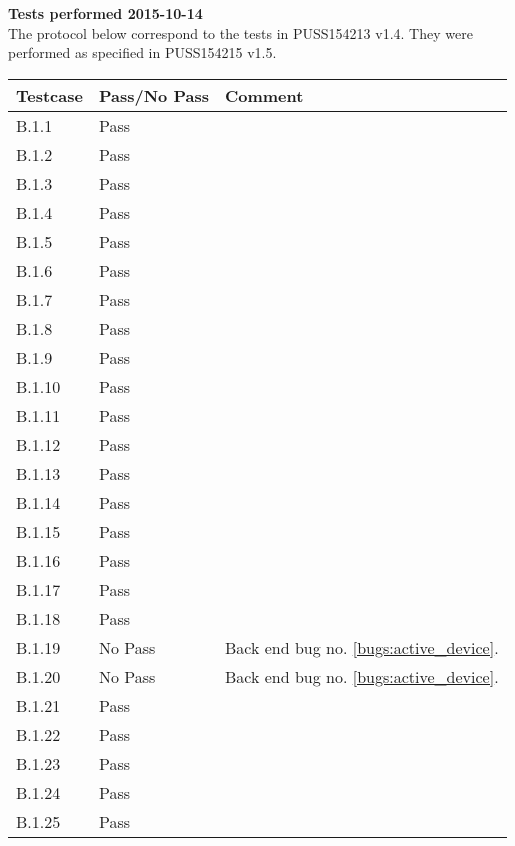 \renewcommand{\testdate}{2015-10-14}
\textbf{ Tests performed \testdate}\\
The protocol below correspond to the tests in PUSS154213 v1.4. They were performed as specified in PUSS154215 v1.5.
\begin{center}
  		\begin{tabular}{| p{3cm} | p{5cm} | p{5cm} |}
    		\hline
	    	\textbf{Testcase}			& \textbf{Pass/No Pass} 	& \textbf{Comment} \\ \hline
    		B.1.1		 						& Pass 										&  				\\ \hline
    		B.1.2		 						& Pass 										& 				 \\	\hline
    		B.1.3		 						& Pass 										& 				 \\	\hline
    		B.1.4		 						& Pass 										& 				 \\	\hline
    		B.1.5		 						& Pass 										& 				 \\	\hline
    		B.1.6		 						& Pass 										& 				 \\	\hline
    		B.1.7		 						& Pass 										& 				 \\	\hline
    		B.1.8		 						& Pass 										& 				 \\	\hline
    		B.1.9		 						& Pass 										& 				 \\	\hline
    		B.1.10	 							& Pass 										& 				 \\	\hline
    		B.1.11	 							& Pass 										& 				 \\	\hline
    		B.1.12	 							& Pass 										& 				 \\	\hline
    		B.1.13	 							& Pass 										& 				 \\	\hline
    		B.1.14	 							& Pass 										& 				 \\	\hline
    		B.1.15	 							& Pass 										& 				 \\	\hline
    		B.1.16	 							& Pass 										& 				 \\	\hline
    		B.1.17	 							& Pass 										& 				 \\	\hline
    		B.1.18	 							& Pass 										& 				 \\	\hline
    		B.1.19	 							& No Pass 									& Back end bug no. \ref{bugs:active_device}.	 \\	\hline
    		B.1.20	 							& No Pass 									& Back end bug no. \ref{bugs:active_device}.	 \\	\hline
    		B.1.21	 							& Pass 										& 				 \\	\hline
    		B.1.22	 							& Pass										& 				 \\	\hline
    		B.1.23	 							& Pass										& 				 \\	\hline
    		B.1.24	 							& Pass 										& 				 \\	\hline
    		B.1.25	 							& Pass										& 				 \\	\hline
 		 \end{tabular}
	\end{center}